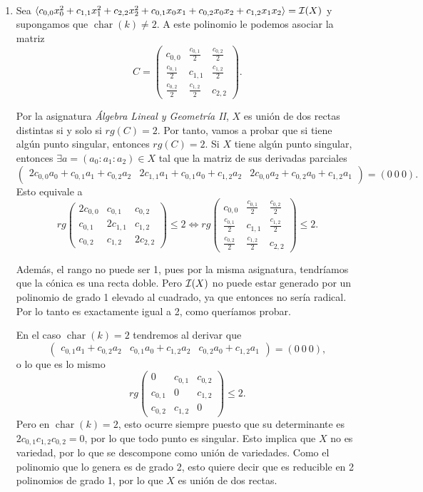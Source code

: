 \documentclass[twoside]{article}
\DeclareMathOperator{\Char}{char}
\begin{document}
\begin{solucion}\
\begin{enumerate}
\item Sea $\langle c_{0,0}x_0^2+c_{1,1}x_1^2+c_{2,2}x_2^2+c_{0,1}x_0x_1+c_{0,2}x_0x_2+c_{1,2}x_1x_2\rangle=\mathcal{I}(X)$ y supongamos que $\Char(k)\neq 2$. A este polinomio le podemos asociar la matriz  
$$C=\begin{pmatrix}
c_{0,0} & \frac{c_{0,1}}{2} &\frac{c_{0,2}}{2}\\
\frac{c_{0,1}}{2}       & c_{1,1} & \frac{c_{1,2}}{2} \\
\frac{c_{0,2}}{2}        &  \frac{c_{1,2}}{2}       & c_{2,2}
\end{pmatrix}.$$

Por la asignatura \emph{Álgebra Lineal y Geometría II}, $X$ es unión de dos rectas distintas si y solo si $rg(C)=2$. Por tanto, vamos a probar que si tiene algún punto singular, entonces $rg(C)= 2$. Si $X$ tiene algún punto singular, entonces $\exists a=(a_0:a_1:a_2)\in X$ tal que la matriz de sus derivadas parciales
$$\begin{pmatrix}
2c_{0,0}a_0 +c_{0,1}a_1+c_{0,2}a_2 & 2c_{1,1}a_1 +c_{0,1}a_0+c_{1,2}a_2 & 2c_{0,0}a_2+c_{0,2}a_0+c_{1,2}a_1
\end{pmatrix}=(0\ 0\ 0).$$
Esto equivale a 
$$rg\begin{pmatrix}
2c_{0,0} & c_{0,1} &c_{0,2}\\
c_{0,1}       & 2c_{1,1} & c_{1,2} \\
c_{0,2}        &  c_{1,2}       & 2c_{2,2}
\end{pmatrix}\leq 2\Leftrightarrow rg\begin{pmatrix}
c_{0,0} & \frac{c_{0,1}}{2} &\frac{c_{0,2}}{2}\\
\frac{c_{0,1}}{2}       & c_{1,1} & \frac{c_{1,2}}{2} \\
\frac{c_{0,2}}{2}        &  \frac{c_{1,2}}{2}       & c_{2,2}
\end{pmatrix}\leq 2.$$

Además, el rango no puede ser 1, pues por la misma asignatura, tendríamos que la cónica es una recta doble. Pero $\mathcal{I}(X)$ no puede estar generado por un polinomio de grado 1 elevado al cuadrado, ya que entonces no sería radical. Por lo tanto es exactamente igual a 2, como queríamos probar.

En el caso $\Char(k)=2$ tendremos al derivar que 
$$\begin{pmatrix}
c_{0,1}a_1+c_{0,2}a_2 & c_{0,1}a_0+c_{1,2}a_2 & c_{0,2}a_0+c_{1,2}a_1
\end{pmatrix}=(0\ 0\ 0),$$
o lo que es lo mismo 
$$rg\begin{pmatrix}
0 & c_{0,1} &c_{0,2}\\
c_{0,1}       & 0 & c_{1,2} \\
c_{0,2}        &  c_{1,2}       & 0
\end{pmatrix}\leq 2.$$
Pero en $\Char(k)=2$, esto ocurre siempre puesto que su determinante es $2c_{0,1}c_{1,2}c_{0,2}=0$, por lo que todo punto es singular. Esto implica que $X$ no es variedad, por lo que se descompone como unión de variedades. Como el polinomio que lo genera es de grado 2, esto quiere decir que es reducible en 2 polinomios de grado 1, por lo que $X$ es unión de dos rectas.


\end{enumerate}
\end{solucion}
\end{document}
